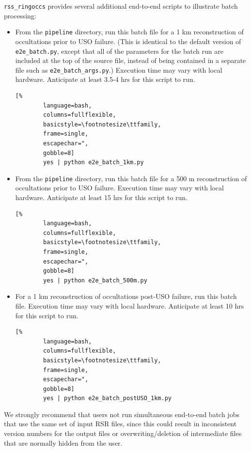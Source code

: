 \documentclass[titlepage, 12pt]{article}
\begin{document}
            \par\hfill\par
            \texttt{rss\_ringoccs} provides several additional end-to-end scripts to illustrate batch processing:
            \begin{itemize}
                \item From the \texttt{pipeline} directory, run this batch file for a 1 km reconstruction of occultations prior to USO failure. (This is identical to the default version of \texttt{e2e\_batch.py}, except that all of the parameters for the batch run are included at the top of the source file, instead of being contained in a separate file such as \texttt{e2e\_batch\_args.py}.) Execution time may vary with local hardware. Anticipate at least 3.5-4 hrs for this script to run.
    \begin{lstlisting}[%
        language=bash,
        columns=fullflexible,
        basicstyle=\footnotesize\ttfamily,
        frame=single,
        escapechar=",
        gobble=8]
        yes | python e2e_batch_1km.py
    \end{lstlisting}
    \item From the \texttt{pipeline} directory, run this batch file for a 500 m reconstruction of occultations prior to USO failure.  Execution time may vary with local hardware. Anticipate at least 15 hrs for this script to run.
    \begin{lstlisting}[%
        language=bash,
        columns=fullflexible,
        basicstyle=\footnotesize\ttfamily,
        frame=single,
        escapechar=",
        gobble=8]
        yes | python e2e_batch_500m.py
    \end{lstlisting}
    \item For a 1 km reconstruction of occultations post-USO failure, run this batch file. Execution time may vary with local hardware. Anticipate at least 10 hrs for this script to run.
    \begin{lstlisting}[%
        language=bash,
        columns=fullflexible,
        basicstyle=\footnotesize\ttfamily,
        frame=single,
        escapechar=",
        gobble=8]
        yes | python e2e_batch_postUSO_1km.py
    \end{lstlisting}
\end{itemize}
We strongly recommend that users not run simultaneous end-to-end batch jobs that use the same set of input RSR files, since this could result in inconsistent version numbers for the output files or overwriting/deletion of intermediate files that are normally hidden from the user.
\end{document}
